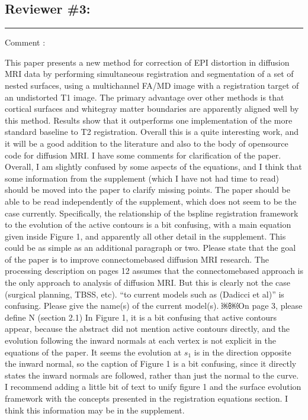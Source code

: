 \documentclass[9pt]{memoir}
\newcounter{reviewpoint}
\newenvironment{reviewpoint}%
{\refstepcounter{reviewpoint}\par\medskip\vspace{3ex}\hrule\vspace{1.5ex}\par\noindent%
   {\fontseries{b}\selectfont Comment \arabic{reviewpoint}:}
   \begingroup%
   \color{black!60}
   \fontshape{it}\selectfont %

}
{\endgroup\label{com:\thereviewpoint}\par\medskip}
\begin{document}
\subsection*{Reviewer \#3:}
\begin{reviewpoint}
This paper presents a new method for correction of EPI distortion in diffusion MRI data by performing simultaneous registration and segmentation of a set of nested surfaces, using a multi­channel FA/MD image with a registration target of an undistorted T1 image. The primary advantage over other methods is that cortical surfaces and white­gray matter boundaries are apparently aligned well by this method. Results show that it outperforms one implementation of the more standard baseline to T2 registration. Overall this is a quite interesting work, and it will be a good addition to the literature and also to the body of open­source code for diffusion MRI.
I have some comments for clarification of the paper.
Overall, I am slightly confused by some aspects of the equations, and I think that some information from the supplement (which I have not had time to read) should be moved into the paper to clarify missing points. The paper should be able to be read independently of the supplement, which does not seem to be the case currently. Specifically, the relationship of the b­spline registration framework to the evolution of the active contours is a bit confusing, with a main equation given inside Figure 1, and apparently all other detail in the supplement. This could be as simple as an additional paragraph or two.
Please state that the goal of the paper is to improve connectome­based diffusion MRI research. The processing description on pages 1­2 assumes that the connectome­based approach is the only approach to analysis of diffusion MRI. But this is clearly not the case (surgical planning, TBSS, etc).
``to current models such as (Dadicci et al)'' is confusing. Please give the name(s) of the current model(s).
￼￼On page 3, please define N (section 2.1)
In Figure 1, it is a bit confusing that active contours appear, because the abstract did not mention active contours directly, and the evolution following the inward normals at each vertex is not explicit in the equations of the paper.
It seems the evolution at $s_1$ is in the direction opposite the inward normal, so the caption of Figure 1 is a bit confusing, since it directly states the inward normals are followed, rather than just the normal to the curve.
I recommend adding a little bit of text to unify figure 1 and the surface evolution framework with the concepts presented in the registration equations section. I think this information may be in the supplement.

\end{reviewpoint}
\end{document}
